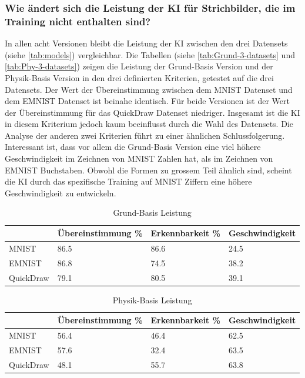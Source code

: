 \subsubsection*{Wie ändert sich die Leistung der KI für Strichbilder, die im Training nicht enthalten sind?}\label{subsub:d_frage_unter_5} 
In allen acht Versionen bleibt die Leistung der KI zwischen den drei Datensets
(siehe \autoref{tab:models}) vergleichbar. Die Tabellen (siehe \autoref{tab:Grund-3-datasets} und \autoref{tab:Phy-3-datasets})
zeigen die Leistung der Grund-Basis Version und der
Physik-Basis Version in den drei definierten Kriterien, getestet auf die drei
Datensets. Der Wert der Übereinstimmung zwischen dem MNIST Datenset und dem
EMNIST Datenset ist beinahe identisch. Für beide Versionen ist der Wert der
Übereinstimmung für das QuickDraw Datenset niedriger. Insgesamt ist die KI in
diesem Kriterium jedoch kaum beeinflusst durch die Wahl des Datensets. Die
Analyse der anderen zwei Kriterien führt zu einer ähnlichen Schlussfolgerung.
Interessant ist, dass vor allem die Grund-Basis Version eine viel höhere
Geschwindigkeit im Zeichnen von MNIST Zahlen hat, als im Zeichnen von EMNIST
Buchstaben. Obwohl die Formen zu grossem Teil ähnlich sind, scheint die KI durch
das spezifische Training auf MNIST Ziffern eine höhere Geschwindigkeit zu
entwickeln.

\begin{table}[!ht]
    \centering
    \caption{Grund-Basis Leistung}\label{tab:Grund-3-datasets}
    \begin{tabular}{|l|l|l|l|}
        \hline
            ~ & Übereinstimmung \% & Erkennbarkeit \% & Geschwindigkeit \\ \hline
            MNIST & 86.5 & 86.6 & 24.5 \\ \hline
            EMNIST & 86.8 & 74.5 & 38.2 \\ \hline
            QuickDraw & 79.1 & 80.5 & 39.1 \\ \hline  
        \end{tabular}
\end{table}

\begin{table}[!ht]
    \centering
    \caption{Physik-Basis Leistung}\label{tab:Phy-3-datasets}
    \begin{tabular}{|l|l|l|l|}
        \hline
            ~ & Übereinstimmung \% & Erkennbarkeit \% & Geschwindigkeit \\ \hline
            MNIST  & 56.4 & 46.4 & 62.5 \\ \hline
            EMNIST & 57.6 & 32.4 & 63.5 \\ \hline
            QuickDraw & 48.1 & 55.7 & 63.8 \\ \hline
        \end{tabular}
\end{table}


